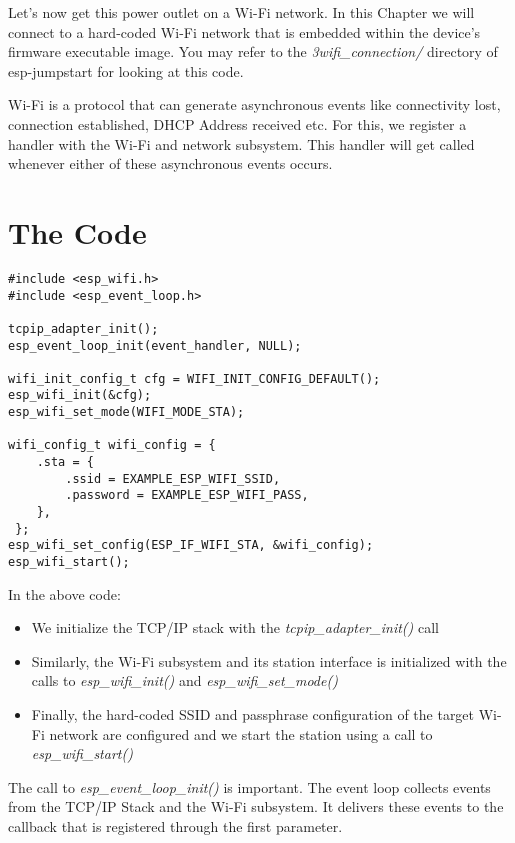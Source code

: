\documentclass[main.tex]{subfiles}
\begin{document}
Let's now get this power outlet on a Wi-Fi network. In this Chapter we will connect to a hard-coded Wi-Fi network that is embedded within the device's firmware executable image. You may refer to the \textit{3wifi\_connection/} directory of esp-jumpstart for looking at this code.

Wi-Fi is a protocol that can generate asynchronous events like connectivity lost, connection established, DHCP Address received etc. For this, we register a handler with the Wi-Fi and network subsystem. This handler will get called whenever either of these asynchronous events occurs.

\section{The Code}
\begin{verbatim}
#include <esp_wifi.h>
#include <esp_event_loop.h>

tcpip_adapter_init();
esp_event_loop_init(event_handler, NULL);

wifi_init_config_t cfg = WIFI_INIT_CONFIG_DEFAULT();
esp_wifi_init(&cfg);
esp_wifi_set_mode(WIFI_MODE_STA);

wifi_config_t wifi_config = {
    .sta = {
        .ssid = EXAMPLE_ESP_WIFI_SSID,
        .password = EXAMPLE_ESP_WIFI_PASS,
    },
 };
esp_wifi_set_config(ESP_IF_WIFI_STA, &wifi_config);
esp_wifi_start();

\end{verbatim}

In the above code:
\begin{itemize}
    \item We initialize the TCP/IP stack with the \textit{tcpip\_adapter\_init()} call
    \item Similarly, the Wi-Fi subsystem and its station interface is initialized with the calls to \textit{esp\_wifi\_init()} and \textit{esp\_wifi\_set\_mode()}
    \item Finally, the hard-coded SSID and passphrase configuration of the target Wi-Fi network are configured and we start the station using a call to \textit{esp\_wifi\_start()}
\end{itemize}

The call to \textit{esp\_event\_loop\_init()} is important. The event loop collects events from the TCP/IP Stack and the Wi-Fi subsystem. It delivers these events to the callback that is registered through the first parameter.

\end{document}
